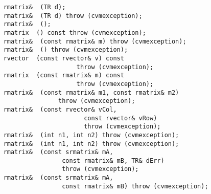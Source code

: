 \verb"    rmatrix& "\verb" (TR d);"\\
\verb"    rmatrix& "\verb" (TR d) throw (cvmexception);"\\
\verb"    rmatrix& "\verb" ();"\\
\verb"    rmatrix "\verb" () const throw (cvmexception);"\\
\verb"    rmatrix& "\verb" (const rmatrix& m) throw (cvmexception);"\\
\verb"    rmatrix& "\verb" () throw (cvmexception);"\\
\verb"    rvector "\verb" (const rvector& v) const"\\
\verb"                        throw (cvmexception);"\\
\verb"    rmatrix "\verb" (const rmatrix& m) const"\\
\verb"                        throw (cvmexception);"\\
\verb"    rmatrix& "\verb" (const rmatrix& m1, const rmatrix& m2)"\\
\verb"                   throw (cvmexception);"\\
\verb"    rmatrix& "\verb" (const rvector& vCol,"\\
\verb"                          const rvector& vRow)"\\
\verb"                          throw (cvmexception);"\\
\verb"    rmatrix& "\verb" (int n1, int n2) throw (cvmexception);"\\
\verb"    rmatrix& "\verb" (int n1, int n2) throw (cvmexception);"\\
\verb"    rmatrix& "\verb" (const srmatrix& mA,"\\
\verb"                    const rmatrix& mB, TR& dErr)"\\
\verb"                    throw (cvmexception);"\\
\verb"    rmatrix& "\verb" (const srmatrix& mA,"\\
\verb"                    const rmatrix& mB) throw (cvmexception);"\\
